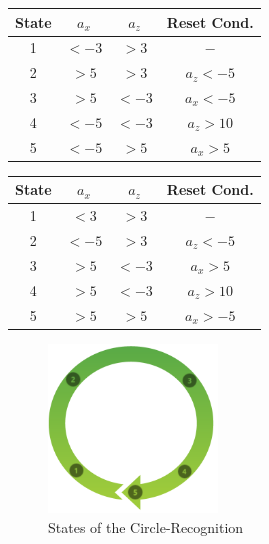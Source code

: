 \vspace{0.5cm}
\begin{minipage}{0.45\textwidth}
\footnotesize
\begin{tabular}{c|c|c|c}
State & $a_x$ & $a_z$ & Reset Cond. \\
\hline
1 & $< -3$ & $> 3$ & $-$\\
2 & $> 5$ & $> 3$ & $a_z < -5$ \\
3 & $> 5$ & $< -3$ & $a_x < -5$ \\
4 & $< -5$ & $< -3$ & $a_z > 10$ \\
5 & $< -5$ & $> 5$ & $a_x > 5$  
\end{tabular}
\label{tab:milestonesCw}
\end{minipage}\hspace{0.1\textwidth}
\begin{minipage}{0.45\textwidth}
\footnotesize
\begin{tabular}{c|c|c|c}
State & $a_x$ & $a_z$ & Reset Cond. \\
\hline
1 & $< 3$ & $> 3$ & $-$\\
2 & $< -5$ & $> 3$ & $a_z < -5$ \\
3 & $> 5$ & $< -3$ & $a_x > 5$ \\
4 & $> 5$ & $< -3$ & $a_z > 10$ \\
5 & $> 5$ & $> 5$ & $a_x > -5$  
\end{tabular}
\label{tab:milestonesCcw}
\end{minipage}

\begin{figure}
\centering
\captionsetup{justification=centering}
\includegraphics[width=0.4\textwidth]{res/gestures/circleMilestones.png}
\caption{States of the Circle-Recognition}
\label{fig:circleStates}
\end{figure}